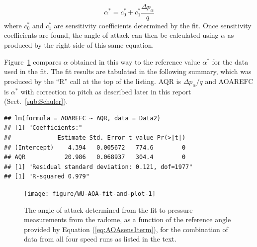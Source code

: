 \documentclass[12pt,twoside,english]{article}\usepackage[]{graphicx}\usepackage[]{color}
\makeatletter
\newenvironment{kframe}{%
 \def\at@end@of@kframe{}%
 \ifinner\ifhmode%
  \def\at@end@of@kframe{\end{minipage}}%
  \begin{minipage}{\columnwidth}%
 \fi\fi%
 \def\FrameCommand##1{\hskip\@totalleftmargin \hskip-\fboxsep
 \colorbox{shadecolor}{##1}\hskip-\fboxsep
     \hskip-\linewidth \hskip-\@totalleftmargin \hskip\columnwidth}%
 \MakeFramed {\advance\hsize-\width
   \@totalleftmargin\z@ \linewidth\hsize
   \@setminipage}}%
 {\par\unskip\endMakeFramed%
 \at@end@of@kframe}
\newenvironment{knitrout}{}{} %
\makeatother
\begin{document}
\begin{equation}
\alpha^{*}=c_{0}^{*}+c_{1}^{*}\frac{\Delta p_{\alpha}}{q}\label{eq:AOAsens1term} 
\end{equation}
where $c_{0}^{*}$ and $c_{1}^{*}$ are sensitivity coefficients determined
by the fit. Once sensitivity coefficients are found, the angle of attack can then
be calculated using $\alpha$ as produced by the right side of this
same equation.

Figure~\ref{fig:AOA-fit-and-plot} compares $\alpha$ obtained in
this way to the reference value $\alpha^{*}$ for the data used in the fit. The fit results
are tabulated in the following summary, which was produced by the
``R'' call at the top of the listing. AQR is $\Delta p_{\alpha}/q$ and AOAREFC is $\alpha^{*}$ with
correction to pitch as described later in this report (Sect.~\ref{sub:Schuler}). 



\begin{knitrout}\footnotesize
{}\color{fgcolor}\begin{kframe}
\begin{verbatim}
## lm(formula = AOAREFC ~ AQR, data = Data2)
## [1] "Coefficients:"
##             Estimate Std. Error t value Pr(>|t|)
## (Intercept)    4.394   0.005672   774.6        0
## AQR           20.986   0.068937   304.4        0
## [1] "Residual standard deviation: 0.121, dof=1977"
## [1] "R-squared 0.979"
\end{verbatim}
\end{kframe}\begin{figure}

{\centering \texttt{[image: figure/WU-AOA-fit-and-plot-1]} 

}

\caption{The angle of attack determined from the fit to pressure measurements from the radome, as a function of the reference angle provided by Equation (\ref{eq:AOAsens1term}), for the combination of data from all four speed runs as listed in the text.}\label{fig:AOA-fit-and-plot}
\end{figure}


\end{knitrout}
\end{document}
